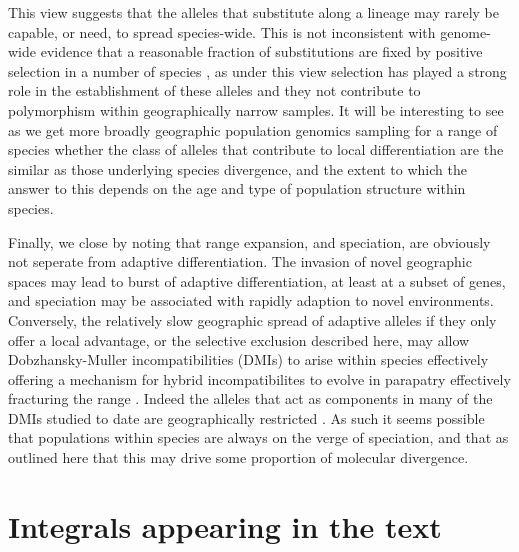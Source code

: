 \documentclass{article}
\begin{document}
This view suggests that the alleles that substitute along a lineage
may rarely be capable, or need, to spread species-wide. This is not
inconsistent with genome-wide evidence that a reasonable fraction of 
substitutions are fixed by positive selection in a number of species
\citep[most notably Drosophila][]{}, as under this view selection has played a strong
role in the establishment of these alleles and they not contribute to
polymorphism within geographically narrow samples. It will be
interesting to see as we get more broadly geographic population
genomics sampling for a range of species whether the class of alleles that contribute 
to local differentiation are the similar as those underlying species
divergence, and the extent to which the answer to this depends on the
age and type of population structure within species. 

Finally, we close by noting that range expansion, and speciation, are obviously not seperate from
adaptive differentiation. The invasion of novel geographic spaces may
lead to burst of adaptive differentiation, at least at a
subset of genes, and speciation may be associated with rapidly
adaption to novel environments. Conversely, the relatively slow geographic spread of adaptive
alleles if they only offer a local advantage, or the selective exclusion
described here, may allow Dobzhansky-Muller incompatibilities (DMIs) to arise
within species effectively offering a mechanism for 
hybrid incompatibilites to evolve in parapatry effectively fracturing
the range \citep{}. Indeed the alleles that act as components in many
of the DMIs studied to
date are geographically restricted \citep[see][]{Cutter:12}. As such
it seems possible that populations within species are always on the
verge of speciation, and that as outlined here that this may drive
some proportion of molecular divergence.



\appendix

\section{Integrals appearing in the text}
    \label{apx:integrals}
\end{document}
